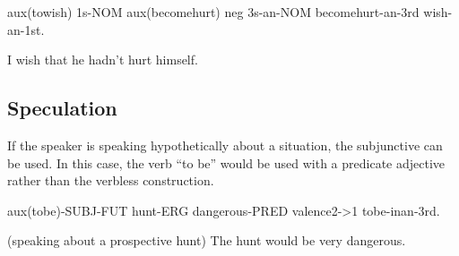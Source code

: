 aux(towish) 1s-NOM aux(becomehurt) neg 3s-an-NOM becomehurt-an-3rd wish-an-1st.

I wish that he hadn't hurt himself.

\subsection{Speculation}

If the speaker is speaking hypothetically about a situation, the subjunctive can
be used. In this case, the verb ``to be'' would be used with a predicate
adjective rather than the verbless construction.

aux(tobe)-SUBJ-FUT hunt-ERG dangerous-PRED valence2->1 tobe-inan-3rd.

(speaking about a prospective hunt) The hunt would be very dangerous.
